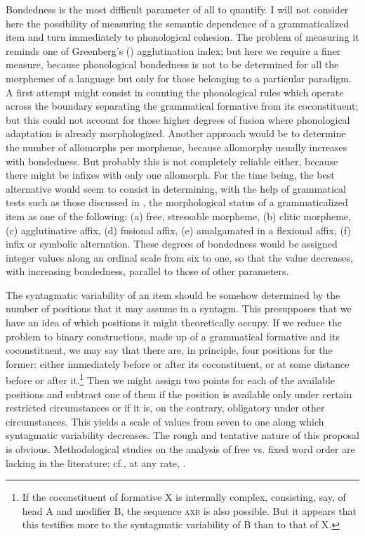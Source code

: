 Bondedness is the most difficult parameter of all to quantify. I will not consider here the possibility of measuring the semantic dependence of a grammaticalized item and turn immediately to phonological cohesion. The problem of measuring it reminds one of Greenberg's (\citeyear{Greenberg1954}) agglutination index; but here we require a finer measure, because phonological bondedness is not to be determined for all the morphemes of a language but only for those belonging to a particular paradigm. A first attempt might consist in counting the phonological rules which operate across the boundary separating the grammatical formative from its coconstituent; but this could not account for those higher degrees of fusion where phonological adaptation is already morphologized. Another approach would be to determine the number of allomorphs per morpheme, because allomorphy usually increases with bondedness. But probably this is not completely reliable either, because there might be infixes with only one allomorph. For the time being, the best alternative would seem to consist in determining, with the help of grammatical tests such as those discussed in , the morphological status of a grammaticalized item as one of the following: (a) free, stressable morpheme, (b) clitic morpheme, (c) agglutinative affix, (d) fusional affix, (e) amalgamated in a flexional affix, (f) infix or symbolic alternation. These degrees of bondedness would be assigned integer values along an ordinal scale from six to one, so that the value decreases, with increasing bondedness, parallel to those of other parameters.

The syntagmatic variability of an item should be somehow determined by the number of positions that it may assume in a syntagm. This presupposes that we have an idea of which positions it might theoretically occupy. If we reduce the problem to binary constructions, made up of a grammatical formative and its coconstituent, we may say that there are, in principle, four positions for the former: either immediately before or after its coconstituent, or at some distance before or after it.\footnote{If the coconstituent of formative X is internally complex, consisting, say, of head A and modifier B, the sequence \textsc{axb} is also possible. But it appears that this testifies more to the syntagmatic variability of B than to that of X.} Then we might assign two points for each of the available positions and subtract one of them if the position is available only under certain restricted circumstances or if it is, on the contrary, obligatory under other circumstances. This yields a scale of values from seven to one along which syntagmatic variability decreases.%
 The rough and tentative nature of this proposal is obvious. Methodological studies on the analysis of free vs. fixed word order are lacking in the literature; cf., at any rate, \citet{Steele1978}.

